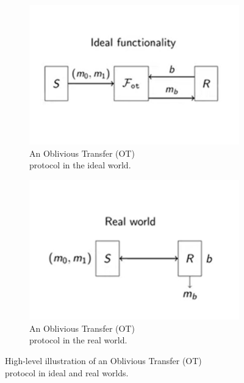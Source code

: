 \documentclass[12pt]{article}
\begin{document}
    \begin{figure}[ht]
        \captionsetup{justification=centering}
        \centering
        \begin{subfigure}{.5\textwidth}
            \centering
            \includegraphics[width=\linewidth]{figures/images/img-5.pdf}
            \caption{An Oblivious Transfer (OT)\\ protocol in the ideal world.}
            \label{fig:oblivious-transfer-protocol-ideal-world}
        \end{subfigure}%
        \begin{subfigure}{.5\textwidth}
            \centering
            \includegraphics[width=\linewidth]{figures/images/img-6.pdf}
            \caption{An Oblivious Transfer (OT)\\ protocol in the real world.}
            \label{fig:oblivious-transfer-protocol-real-world}
        \end{subfigure}
        \caption{High-level illustration of an Oblivious Transfer (OT)\\ protocol in ideal and real worlds.}
        \label{fig:oblivious-transfer-protocol-ideal-and-real-worlds}
    \end{figure}
\end{document}
